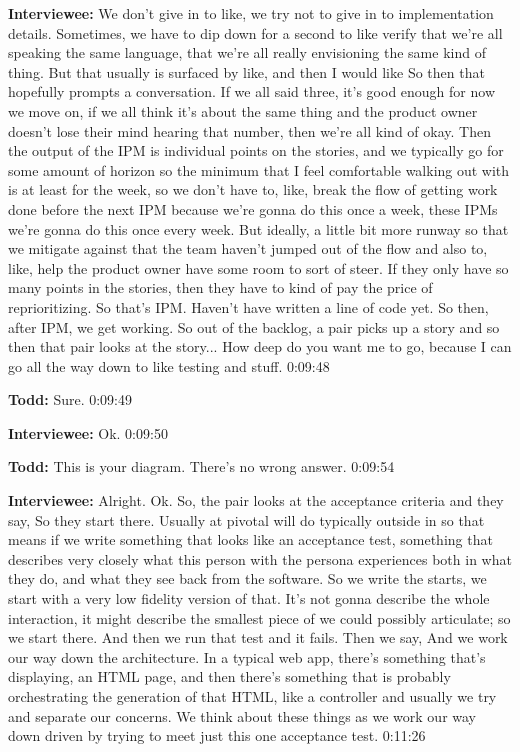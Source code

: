 \textbf{Interviewee:}   	We don't give in to like, we try not to give in to implementation details.  Sometimes, we have to dip down for a second to like verify that we're all speaking the same language, that we're all really envisioning the same kind of thing.  But that usually is surfaced by like,  and then I would like   So then that hopefully prompts a conversation.  If we all said three, it's good enough for now we move on, if we all think it's about the same thing and the product owner doesn't lose their mind hearing that number, then we're all kind of okay.  Then the output of the IPM is individual points on the stories, and we typically go for some amount of horizon so the minimum that I feel comfortable walking out with is at least for the week, so we don't have to, like, break the flow of getting work done before the next IPM because we're gonna do this once a week, these IPMs we're gonna do this once every week. But ideally, a little bit more runway so that we mitigate against that the team haven't jumped out of the flow and also to, like, help the product owner have some room to sort of steer.  If they only have so many points in the stories, then they have to kind of pay the price of reprioritizing. So that's IPM.  Haven't have written a line of code yet.   So then, after IPM, we get working. So out of the backlog, a pair picks up a story and so then that pair looks at the story...  How deep do you want me to go, because I can go all the way down to like testing and stuff.  0:09:48

\textbf{Todd:}  	Sure.  0:09:49

\textbf{Interviewee:}	Ok.  0:09:50

\textbf{Todd:}	This is your diagram.  There's no wrong answer.  0:09:54

\textbf{Interviewee:}  	Alright. Ok.  So, the pair looks at the acceptance criteria and they say,   So they start there.  Usually at pivotal will do typically outside in so that means if we write something that looks like an acceptance test, something that describes very closely what this person with the persona experiences both in what they do, and what they see back from the software.  So we write the starts, we start with a very low fidelity version of that. It's not gonna describe the whole interaction, it might describe the smallest piece of we could possibly articulate; so we start there.  And then we run that test and it fails.  Then we say,   And we work our way down the architecture.  In a typical web app, there's something that's displaying, an HTML page, and then there's something that is probably orchestrating the generation of that HTML, like a controller and usually we try and separate our concerns. We think about these things as we work our way down driven by trying to meet just this one acceptance test.  0:11:26

